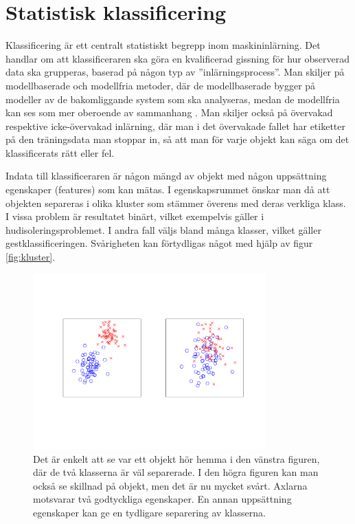 \documentclass[../rapport_MVEX01-11-05]{subfiles}
\begin{document}
\section{Statistisk klassificering}\label{sec:klassificering}

Klassificering är ett centralt statistiskt begrepp inom maskininlärning.
Det handlar om att klassificeraren ska göra en kvalificerad gissning för hur
observerad data ska grupperas, baserad på någon typ av ''inlärningsprocess''.
Man skiljer på modellbaserade och modellfria metoder, där de modellbaserade
bygger på modeller av de bakomliggande system som ska analyseras, medan de
modellfria kan ses som mer oberoende av sammanhang \cite{Hastie09}.
Man skiljer också på övervakad respektive icke-övervakad inlärning,
där man i det övervakade fallet har etiketter på den träningsdata man stoppar
in, så att man för varje objekt kan säga om det klassificerats rätt eller
fel.

Indata till klassificeraren är någon mängd av objekt med någon uppsättning
egenskaper (features) som kan mätas.
I egenskapsrummet önskar man då att objekten separeras i olika kluster
som stämmer överens med deras verkliga klass.
I vissa problem är resultatet binärt,
vilket exempelvis gäller i hudisoleringsproblemet.
I andra fall väljs bland många klasser, vilket gäller gestklassificeringen.
Svårigheten kan förtydligas något med hjälp av figur \vref{fig:kluster}.
\begin{figure}[!htpb]
    \begin{center}
\includegraphics[width=0.8\textwidth,clip=true,trim=2cm 3cm 1.5cm 3cm]{bilder/kluster.pdf}
    \end{center}
    \caption{Det är enkelt att se var ett objekt hör hemma i den vänstra figuren,
    där de två klasserna är väl separerade. I den högra figuren kan man också se
    skillnad på objekt, men det är nu mycket svårt. Axlarna motsvarar
    två godtyckliga egenskaper. En annan uppsättning egenskaper kan ge en
    tydligare separering av klasserna.}
    \label{fig:kluster}
\end{figure}
\end{document}
